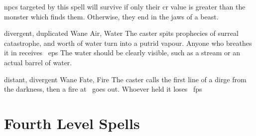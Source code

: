 \begin{multicols}{2}
{    \Glspl{npc} targeted by this spell will survive if only their \gls{cr} value is greater than the monster which finds them.
    Otherwise, they end in the jaws of a beast.
  }

  {divergent, duplicated}%
  {Wane}%
  {Air, Water}%
  {}%
  {The caster spits prophecies of surreal catastrophe, and  worth of water turn into a putrid vapour.
  Anyone who breathes it in receives ~\glspl{ep}}%
  {
    The water should be clearly visible, such as a stream or an actual barrel of water.}

  {distant, divergent}%
  {Wane}%
  {Fate, Fire}%
  {}%
  {The caster calls the first line of a dirge from the darkness, then a fire at \spellRange\ goes out.
  Whoever held it loses \showDam~\glspl{fp}}%
  {}


\end{multicols}

\filbreak
\section{Fourth Level Spells}


